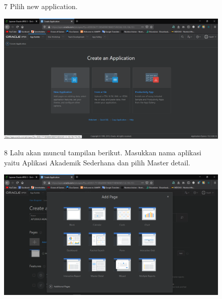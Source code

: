 \begin{enumerate}
\begin{figure}[!htbp]    
\item[7] Pilih new application.
\begin{center}
    \includegraphics[scale=0.3]{figures/Screenshot(51).png}
    \end{center}
    \end{figure}
    
\begin{figure}[!htbp]
\item[8] Lalu akan muncul tampilan berikut. Masukkan nama aplikasi yaitu Aplikasi Akademik Sederhana dan pilih Master detail.
\begin{center}
    \includegraphics[scale=0.3]{figures/Screenshot(52).png}
    \end{center}
    \end{figure}
    

\end{enumerate}
